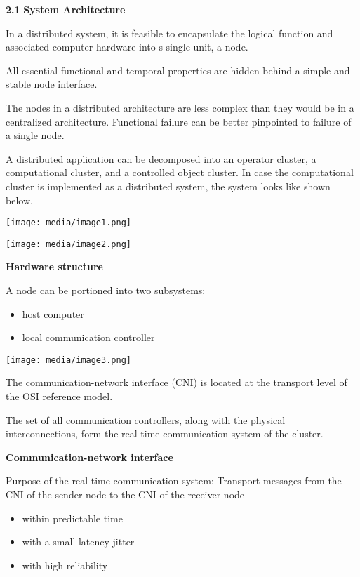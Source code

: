 \textbf{2.1} \protect\hypertarget{teil2}{}{}\textbf{System Architecture}

In a distributed system, it is feasible to encapsulate the logical
function and associated computer hardware into s single unit, a node.

All essential functional and temporal properties are hidden behind a
simple and stable node interface.

The nodes in a distributed architecture are less complex than they would
be in a centralized architecture. Functional failure can be better
pinpointed to failure of a single node.

A distributed application can be decomposed into an operator cluster, a
computational cluster, and a controlled object cluster. In case the
computational cluster is implemented as a distributed system, the system
looks like shown below.

\texttt{[image: media/image1.png]}

\protect\hypertarget{ux5fux5fFieldmarkux5fux5f8ux5f1847268712}{}{}\texttt{[image: media/image2.png]}

\textbf{Hardware structure}

A node can be portioned into two subsystems:

\begin{itemize}
\item
  host computer
\item
  local communication controller
\end{itemize}

\texttt{[image: media/image3.png]}

The communication-network interface (CNI) is located at the transport
level of the OSI reference model.

The set of all communication controllers, along with the physical
interconnections, form the real-time communication system of the
cluster.

\textbf{Communication-network interface}

Purpose of the real-time communication system: Transport messages from
the CNI of the sender node to the CNI of the receiver node

\begin{itemize}
\item
  within predictable time
\item
  with a small latency jitter
\item
  with high reliability
\end{itemize}

